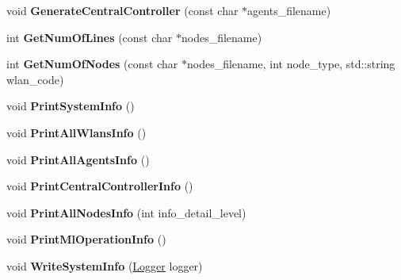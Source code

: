 \begin{DoxyCompactItemize}
void {\bfseries Generate\+Central\+Controller} (const char $\ast$agents\+\_\+filename)
\item 
\mbox{\label{classcompcxx__Komondor__27_aab5cb7d69218b4c26ba1635abbc1c10d}} 
int {\bfseries Get\+Num\+Of\+Lines} (const char $\ast$nodes\+\_\+filename)
\item 
\mbox{\label{classcompcxx__Komondor__27_a6e1d577a7bbc4995ebcf8dc0e9dc55e3}} 
int {\bfseries Get\+Num\+Of\+Nodes} (const char $\ast$nodes\+\_\+filename, int node\+\_\+type, std\+::string wlan\+\_\+code)
\item 
\mbox{\label{classcompcxx__Komondor__27_aa9440e8685f2f2df0cfe2e15833e6817}} 
void {\bfseries Print\+System\+Info} ()
\item 
\mbox{\label{classcompcxx__Komondor__27_ab3913b053b3c0d726c56a12e51e57585}} 
void {\bfseries Print\+All\+Wlans\+Info} ()
\item 
\mbox{\label{classcompcxx__Komondor__27_a58807e58cc62af62f66b16dbcf4bb29f}} 
void {\bfseries Print\+All\+Agents\+Info} ()
\item 
\mbox{\label{classcompcxx__Komondor__27_ab8335a20831b55ac1f1a9b10ff2767a6}} 
void {\bfseries Print\+Central\+Controller\+Info} ()
\item 
\mbox{\label{classcompcxx__Komondor__27_aa276649f84ccf1f260a0b1b2eaee65f0}} 
void {\bfseries Print\+All\+Nodes\+Info} (int info\+\_\+detail\+\_\+level)
\item 
\mbox{\label{classcompcxx__Komondor__27_a4f7651e20f499842bb4dbaaebc8878b9}} 
void {\bfseries Print\+Ml\+Operation\+Info} ()
\item 
\mbox{\label{classcompcxx__Komondor__27_a14875aea46ab2caa660dea3b760e5f41}} 
void {\bfseries Write\+System\+Info} (\hyperlink{structLogger}{Logger} logger)
\item 
\mbox{\label{classcompcxx__Komondor__27_a7a55b574d7e52e764d01b37cf880015e}} 

\end{DoxyCompactItemize}
